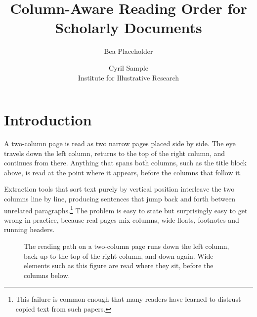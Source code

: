 \documentclass[10pt,twocolumn]{article}
\title{Column-Aware Reading Order for Scholarly Documents}
\author{Bea Placeholder \and Cyril Sample\\ Institute for Illustrative Research}
\date{}
\begin{document}

\section{Introduction}

A two-column page is read as two narrow pages placed side by side. The eye
travels down the left column, returns to the top of the right column, and
continues from there. Anything that spans both columns, such as the title
block above, is read at the point where it appears, before the columns that
follow it.

Extraction tools that sort text purely by vertical position interleave the
two columns line by line, producing sentences that jump back and forth
between unrelated paragraphs.\footnote{This failure is common enough that
many readers have learned to distrust copied text from such papers.} The
problem is easy to state but surprisingly easy to get wrong in practice,
because real pages mix columns, wide floats, footnotes and running headers.

\begin{figure}[t]
  \centering
  \caption{The reading path on a two-column page runs down the left column,
  back up to the top of the right column, and down again. Wide elements
  such as this figure are read where they sit, before the columns below.}
  \label{fig:path}
\end{figure}
\end{document}
